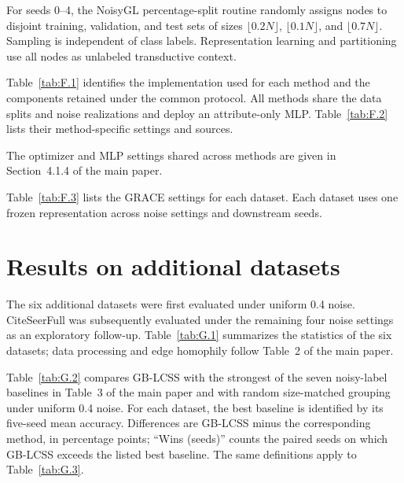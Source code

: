 \documentclass[10pt,letterpaper,nopreprintline]{elsarticle}
\begin{document}
For seeds 0--4, the NoisyGL percentage-split routine randomly assigns nodes to disjoint training, validation, and test sets of sizes \(\lfloor 0.2N\rfloor\), \(\lfloor 0.1N\rfloor\), and \(\lfloor 0.7N\rfloor\). Sampling is independent of class labels. Representation learning and partitioning use all nodes as unlabeled transductive context.

Table~\ref{tab:F.1} identifies the implementation used for each method and the components retained under the common protocol. All methods share the data splits and noise realizations and deploy an attribute-only MLP. Table~\ref{tab:F.2} lists their method-specific settings and sources.



The optimizer and MLP settings shared across methods are given in Section~4.1.4 of the main paper.



Table~\ref{tab:F.3} lists the GRACE settings for each dataset. Each dataset uses one frozen representation across noise settings and downstream seeds.



\FloatBarrier

\setcounter{table}{0}

\section{Results on additional datasets}\label{sec:G}

The six additional datasets were first evaluated under uniform 0.4 noise. CiteSeerFull was subsequently evaluated under the remaining four noise settings as an exploratory follow-up. Table~\ref{tab:G.1} summarizes the statistics of the six datasets; data processing and edge homophily follow Table~2 of the main paper.



Table~\ref{tab:G.2} compares GB-LCSS with the strongest of the seven noisy-label baselines in Table~3 of the main paper and with random size-matched grouping under uniform 0.4 noise. For each dataset, the best baseline is identified by its five-seed mean accuracy. Differences are GB-LCSS minus the corresponding method, in percentage points; ``Wins (seeds)'' counts the paired seeds on which GB-LCSS exceeds the listed best baseline. The same definitions apply to Table~\ref{tab:G.3}.


\end{document}
